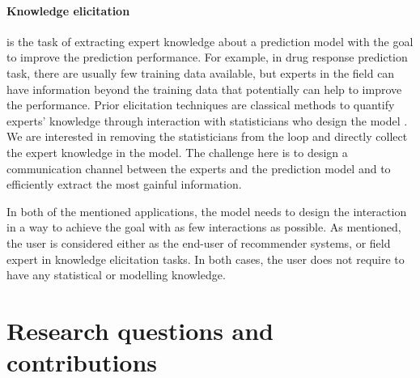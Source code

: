 \documentclass[dissertation,math,vertlayout,pdfa,colorlinks]{aaltoseries}
\begin{document}
\paragraph{Knowledge elicitation} is the task of extracting expert knowledge about a prediction model with the goal to improve the prediction performance. For example, in drug response prediction task, there are usually few training data available, but experts in the field can have information beyond the training data that potentially can help to improve the performance. Prior elicitation techniques are classical methods to quantify experts' knowledge through interaction with statisticians who design the model \cite{OHagan06}. We are interested in removing the statisticians from the loop and directly collect the expert knowledge in the model. The challenge here is to design a communication channel between the experts and the prediction model and to efficiently extract the most gainful information.   

In both of the mentioned applications, the model needs to design the interaction in a way to achieve the goal with as few interactions as possible. As mentioned, the user is considered either as the end-user of recommender systems, or field expert in knowledge elicitation tasks. In both cases, the user does not require to have any statistical or modelling knowledge.





 
\section{Research questions and contributions}
\end{document}
